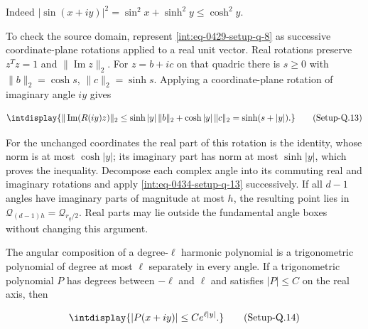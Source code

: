 
Indeed \(|\sin(x+iy)|^2=\sin^2x+\sinh^2y\le\cosh^2y\).



To check the source domain, represent \hyperref[int:eq-setup-q-8]{\eqref{int:eq-0429-setup-q-8}} as successive coordinate-plane rotations applied to a real unit vector. Real rotations preserve \(z^Tz=1\) and \(\|\operatorname{Im}z\|_2\). For \(z=b+ic\) on that quadric there is \(s\ge0\) with \(\|b\|_2=\cosh s\), \(\|c\|_2=\sinh s\). Applying a coordinate-plane rotation of imaginary angle \(iy\) gives


\label{int:eq-setup-q-13}
\begingroup\renewcommand{\theHequation}{intdisplay.881}
\begin{equation}
\intdisplay{
\|\operatorname{Im}(R(iy)z)\|_2
\le \sinh|y|\,\|b\|_2+\cosh|y|\,\|c\|_2
=\sinh(s+|y|).
}
\tag{Setup-Q.13}
\label{int:eq-0434-setup-q-13}
\end{equation}
\endgroup


For the unchanged coordinates the real part of this rotation is the identity, whose norm is at most \(\cosh|y|\); its imaginary part has norm at most \(\sinh|y|\), which proves the inequality. Decompose each complex angle into its commuting real and imaginary rotations and apply \hyperref[int:eq-setup-q-13]{\eqref{int:eq-0434-setup-q-13}} successively. If all \(d-1\) angles have imaginary parts of magnitude at most \(h\), the resulting point lies in \(\mathcal Q_{(d-1)h}=\mathcal Q_{r_q/2}\). Real parts may lie outside the fundamental angle boxes without changing this argument.



The angular composition of a degree-\(\ell\) harmonic polynomial is a trigonometric polynomial of degree at most \(\ell\) separately in every angle. If a trigonometric polynomial \(P\) has degrees between \(-\ell\) and \(\ell\) and satisfies \(|P|\le C\) on the real axis, then


\label{int:eq-setup-q-14}
\begingroup\renewcommand{\theHequation}{intdisplay.882}
\begin{equation}
\intdisplay{
|P(x+iy)|\le C e^{\ell|y|}.
}
\tag{Setup-Q.14}
\label{int:eq-0435-setup-q-14}
\end{equation}
\endgroup

